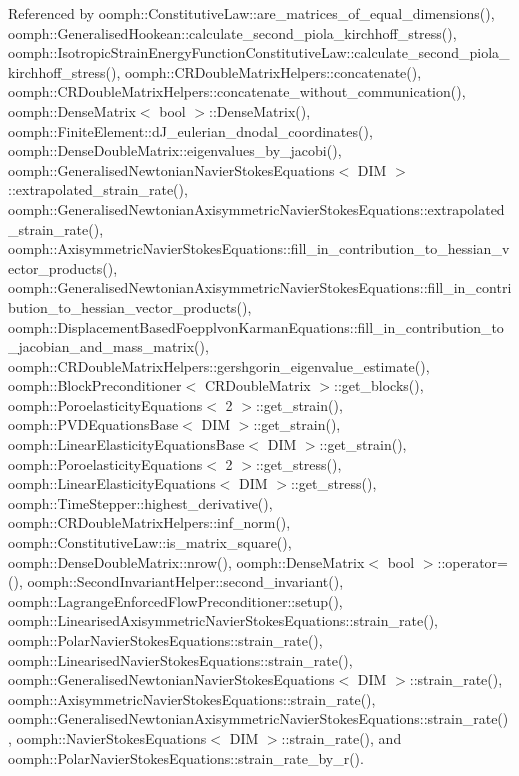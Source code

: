 Referenced by oomph\+::\+Constitutive\+Law\+::are\+\_\+matrices\+\_\+of\+\_\+equal\+\_\+dimensions(), oomph\+::\+Generalised\+Hookean\+::calculate\+\_\+second\+\_\+piola\+\_\+kirchhoff\+\_\+stress(), oomph\+::\+Isotropic\+Strain\+Energy\+Function\+Constitutive\+Law\+::calculate\+\_\+second\+\_\+piola\+\_\+kirchhoff\+\_\+stress(), oomph\+::\+C\+R\+Double\+Matrix\+Helpers\+::concatenate(), oomph\+::\+C\+R\+Double\+Matrix\+Helpers\+::concatenate\+\_\+without\+\_\+communication(), oomph\+::\+Dense\+Matrix$<$ bool $>$\+::\+Dense\+Matrix(), oomph\+::\+Finite\+Element\+::d\+J\+\_\+eulerian\+\_\+dnodal\+\_\+coordinates(), oomph\+::\+Dense\+Double\+Matrix\+::eigenvalues\+\_\+by\+\_\+jacobi(), oomph\+::\+Generalised\+Newtonian\+Navier\+Stokes\+Equations$<$ D\+I\+M $>$\+::extrapolated\+\_\+strain\+\_\+rate(), oomph\+::\+Generalised\+Newtonian\+Axisymmetric\+Navier\+Stokes\+Equations\+::extrapolated\+\_\+strain\+\_\+rate(), oomph\+::\+Axisymmetric\+Navier\+Stokes\+Equations\+::fill\+\_\+in\+\_\+contribution\+\_\+to\+\_\+hessian\+\_\+vector\+\_\+products(), oomph\+::\+Generalised\+Newtonian\+Axisymmetric\+Navier\+Stokes\+Equations\+::fill\+\_\+in\+\_\+contribution\+\_\+to\+\_\+hessian\+\_\+vector\+\_\+products(), oomph\+::\+Displacement\+Based\+Foepplvon\+Karman\+Equations\+::fill\+\_\+in\+\_\+contribution\+\_\+to\+\_\+jacobian\+\_\+and\+\_\+mass\+\_\+matrix(), oomph\+::\+C\+R\+Double\+Matrix\+Helpers\+::gershgorin\+\_\+eigenvalue\+\_\+estimate(), oomph\+::\+Block\+Preconditioner$<$ C\+R\+Double\+Matrix $>$\+::get\+\_\+blocks(), oomph\+::\+Poroelasticity\+Equations$<$ 2 $>$\+::get\+\_\+strain(), oomph\+::\+P\+V\+D\+Equations\+Base$<$ D\+I\+M $>$\+::get\+\_\+strain(), oomph\+::\+Linear\+Elasticity\+Equations\+Base$<$ D\+I\+M $>$\+::get\+\_\+strain(), oomph\+::\+Poroelasticity\+Equations$<$ 2 $>$\+::get\+\_\+stress(), oomph\+::\+Linear\+Elasticity\+Equations$<$ D\+I\+M $>$\+::get\+\_\+stress(), oomph\+::\+Time\+Stepper\+::highest\+\_\+derivative(), oomph\+::\+C\+R\+Double\+Matrix\+Helpers\+::inf\+\_\+norm(), oomph\+::\+Constitutive\+Law\+::is\+\_\+matrix\+\_\+square(), oomph\+::\+Dense\+Double\+Matrix\+::nrow(), oomph\+::\+Dense\+Matrix$<$ bool $>$\+::operator=(), oomph\+::\+Second\+Invariant\+Helper\+::second\+\_\+invariant(), oomph\+::\+Lagrange\+Enforced\+Flow\+Preconditioner\+::setup(), oomph\+::\+Linearised\+Axisymmetric\+Navier\+Stokes\+Equations\+::strain\+\_\+rate(), oomph\+::\+Polar\+Navier\+Stokes\+Equations\+::strain\+\_\+rate(), oomph\+::\+Linearised\+Navier\+Stokes\+Equations\+::strain\+\_\+rate(), oomph\+::\+Generalised\+Newtonian\+Navier\+Stokes\+Equations$<$ D\+I\+M $>$\+::strain\+\_\+rate(), oomph\+::\+Axisymmetric\+Navier\+Stokes\+Equations\+::strain\+\_\+rate(), oomph\+::\+Generalised\+Newtonian\+Axisymmetric\+Navier\+Stokes\+Equations\+::strain\+\_\+rate(), oomph\+::\+Navier\+Stokes\+Equations$<$ D\+I\+M $>$\+::strain\+\_\+rate(), and oomph\+::\+Polar\+Navier\+Stokes\+Equations\+::strain\+\_\+rate\+\_\+by\+\_\+r().

